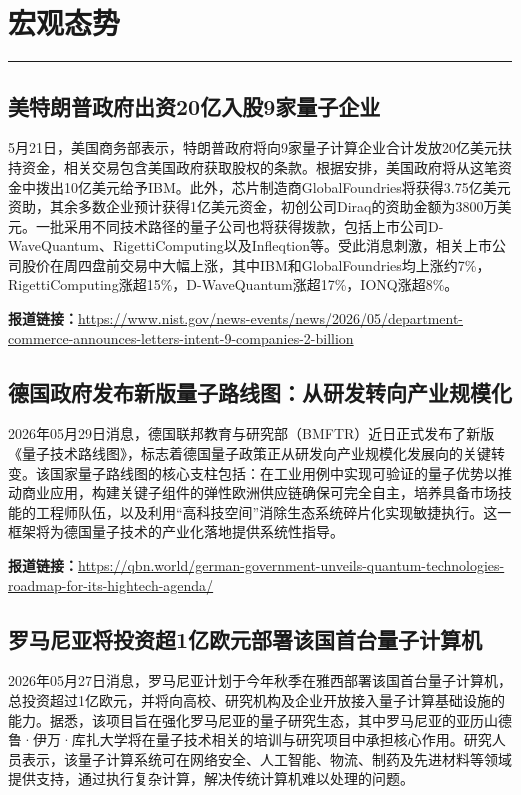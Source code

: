 \documentclass[12pt,a4paper]{ctexart}
\begin{document}
\newpage
\section{宏观态势}
\vspace{-0.5em}
\noindent\rule{\linewidth}{1.5pt}

\subsection{ 美特朗普政府出资20亿入股9家量子企业}

5月21日，美国商务部表示，特朗普政府将向9家量子计算企业合计发放20亿美元扶持资金，相关交易包含美国政府获取股权的条款。根据安排，美国政府将从这笔资金中拨出10亿美元给予IBM。此外，芯片制造商GlobalFoundries将获得3.75亿美元资助，其余多数企业预计获得1亿美元资金，初创公司Diraq的资助金额为3800万美元。一批采用不同技术路径的量子公司也将获得拨款，包括上市公司D-WaveQuantum、RigettiComputing以及Infleqtion等。受此消息刺激，相关上市公司股价在周四盘前交易中大幅上涨，其中IBM和GlobalFoundries均上涨约7\%，RigettiComputing涨超15\%，D-WaveQuantum涨超17\%，IONQ涨超8\%。

\noindent\textbf{报道链接：}\url{https://www.nist.gov/news-events/news/2026/05/department-commerce-announces-letters-intent-9-companies-2-billion}

\subsection{ 德国政府发布新版量子路线图：从研发转向产业规模化 }

2026年05月29日消息，德国联邦教育与研究部（BMFTR）近日正式发布了新版《量子技术路线图》，标志着德国量子政策正从研发向产业规模化发展向的关键转变。该国家量子路线图的核心支柱包括：在工业用例中实现可验证的量子优势以推动商业应用，构建关键子组件的弹性欧洲供应链确保可完全自主，培养具备市场技能的工程师队伍，以及利用“高科技空间”消除生态系统碎片化实现敏捷执行。这一框架将为德国量子技术的产业化落地提供系统性指导。

\noindent\textbf{报道链接：}\url{https://qbn.world/german-government-unveils-quantum-technologies-roadmap-for-its-hightech-agenda/ }

\subsection{ 罗马尼亚将投资超1亿欧元部署该国首台量子计算机 }

2026年05月27日消息，罗马尼亚计划于今年秋季在雅西部署该国首台量子计算机，总投资超过1亿欧元，并将向高校、研究机构及企业开放接入量子计算基础设施的能力。据悉，该项目旨在强化罗马尼亚的量子研究生态，其中罗马尼亚的亚历山德鲁·伊万·库扎大学将在量子技术相关的培训与研究项目中承担核心作用。研究人员表示，该量子计算系统可在网络安全、人工智能、物流、制药及先进材料等领域提供支持，通过执行复杂计算，解决传统计算机难以处理的问题。
\end{document}
